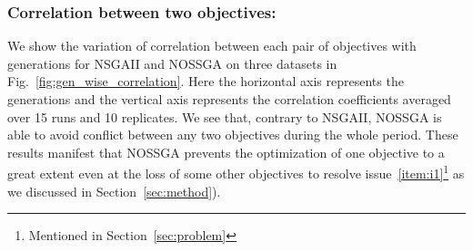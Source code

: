 \subsubsection{Correlation between two objectives:} We show the variation of correlation between each pair of objectives with generations for NSGAII and NOSSGA on three datasets in Fig.~\ref{fig:gen_wise_correlation}. Here the horizontal axis represents the generations and the vertical axis represents the correlation coefficients averaged over 15 runs and 10 replicates. We see that, contrary to NSGAII, NOSSGA is able to avoid conflict between any two objectives during the whole period. These results manifest that NOSSGA prevents the optimization of one objective to a great extent even at the loss of some other objectives to resolve issue~\ref{item:i1}\footnote{Mentioned in Section~\ref{sec:problem}} as we discussed in Section~\ref{sec:method}). %

